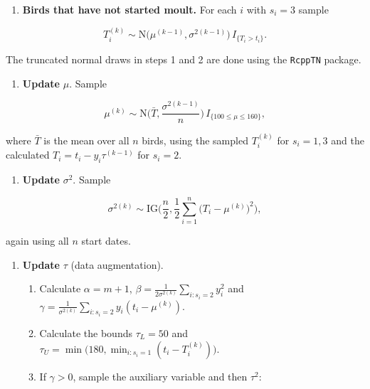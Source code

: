 \documentclass[
  12pt,
]{article}
\newcommand{\passthrough}[1]{#1}
\providecommand{\tightlist}{%
  \setlength{\itemsep}{0pt}\setlength{\parskip}{0pt}}
\begin{document}
\begin{enumerate}
\def\labelenumi{\arabic{enumi}.}
\setcounter{enumi}{1}
\tightlist
\item
  \textbf{Birds that have not started moult.} For each \(i\) with
  \(s_i = 3\) sample
\end{enumerate}

\[
T_i^{(k)} \sim \text{N}\big(\mu^{(k-1)}, \sigma^{2(k-1)}\big) \, I_{\{T_i > t_i\}}.
\]

The truncated normal draws in steps 1 and 2 are done using the
\passthrough{\lstinline!RcppTN!} package.

\begin{enumerate}
\def\labelenumi{\arabic{enumi}.}
\setcounter{enumi}{2}
\tightlist
\item
  \textbf{Update} \(\mu\). Sample
\end{enumerate}

\[
\mu^{(k)} \sim \text{N}\Big(\bar{T}, \frac{\sigma^{2(k-1)}}{n}\Big) \, I_{\{100 \leq \mu \leq 160\}},
\]

where \(\bar{T}\) is the mean over all \(n\) birds, using the sampled
\(T_i^{(k)}\) for \(s_i = 1, 3\) and the calculated
\(T_i = t_i - y_i \tau^{(k-1)}\) for \(s_i = 2\).

\begin{enumerate}
\def\labelenumi{\arabic{enumi}.}
\setcounter{enumi}{3}
\tightlist
\item
  \textbf{Update} \(\sigma^2\). Sample
\end{enumerate}

\[
\sigma^{2(k)} \sim \text{IG}\Big(\frac{n}{2}, \frac{1}{2} \sum_{i=1}^n \big(T_i - \mu^{(k)}\big)^2\Big),
\]

again using all \(n\) start dates.

\begin{enumerate}
\def\labelenumi{\arabic{enumi}.}
\setcounter{enumi}{4}
\item
  \textbf{Update} \(\tau\) (data augmentation).

  \begin{enumerate}
  \def\labelenumii{\alph{enumii}.}
  \item
    Calculate \(\alpha = m+1\),
    \(\beta = \frac{1}{2\sigma^{2(k)}} \sum_{i: s_i = 2} y_i^2\) and
    \(\gamma = \frac{1}{\sigma^{2(k)}} \sum_{i: s_i = 2} y_i (t_i - \mu^{(k)})\).
  \item
    Calculate the bounds \(\tau_L = 50\) and
    \(\tau_U = \min\big(180, \min_{i: s_i = 1} (t_i - T_i^{(k)})\big)\).
  \item
    If \(\gamma > 0\), sample the auxiliary variable and then
    \(\tau^2\):
  \end{enumerate}
\end{enumerate}
\end{document}
